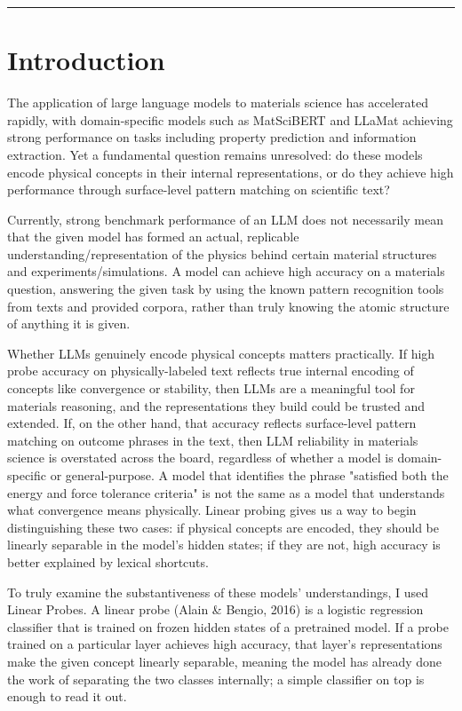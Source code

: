 \documentclass[11pt]{article}
\begin{document}
\vspace{1em}
\hrule
\vspace{1.5em}

\section{Introduction}

The application of large language models to materials science has accelerated rapidly, with domain-specific models such as MatSciBERT and LLaMat achieving strong performance on tasks including property prediction and information extraction. Yet a fundamental question remains unresolved: do these models encode physical concepts in their internal representations, or do they achieve high performance through surface-level pattern matching on scientific text?

Currently, strong benchmark performance of an LLM does not necessarily mean that the given model has formed an actual, replicable understanding/representation of the physics behind certain material structures and experiments/simulations. A model can achieve high accuracy on a materials question, answering the given task by using the known pattern recognition tools from texts and provided corpora, rather than truly knowing the atomic structure of anything it is given. 

Whether LLMs genuinely encode physical concepts matters practically. If high probe accuracy on physically-labeled text reflects true internal encoding of concepts like convergence or stability, then LLMs are a meaningful tool for materials reasoning, and the representations they build could be trusted and extended. If, on the other hand, that accuracy reflects surface-level pattern matching on outcome phrases in the text, then LLM reliability in materials science is overstated across the board, regardless of whether a model is domain-specific or general-purpose. A model that identifies the phrase "satisfied both the energy and force tolerance criteria" is not the same as a model that understands what convergence means physically. Linear probing gives us a way to begin distinguishing these two cases: if physical concepts are encoded, they should be linearly separable in the model's hidden states; if they are not, high accuracy is better explained by lexical shortcuts.

To truly examine the substantiveness of these models' understandings, I used Linear Probes. A linear probe (Alain \& Bengio, 2016) is a logistic regression classifier that is trained on frozen hidden states of a pretrained model. If a probe trained on a particular layer achieves high accuracy, that layer's representations make the given concept linearly separable, meaning the model has already done the work of separating the two classes internally; a simple classifier on top is enough to read it out.
\end{document}
